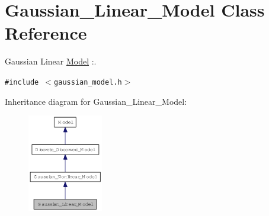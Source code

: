 \hypertarget{class_gaussian___linear___model}{
\section{Gaussian\_\-Linear\_\-Model Class Reference}
\label{class_gaussian___linear___model}
}
Gaussian Linear \hyperlink{class_model}{Model} :.  


{\tt \#include $<$gaussian\_\-model.h$>$}

Inheritance diagram for Gaussian\_\-Linear\_\-Model:\nopagebreak
\begin{figure}[H]
\begin{center}
\leavevmode
\includegraphics[width=93pt]{class_gaussian___linear___model__inherit__graph}
\end{center}
\end{figure}
